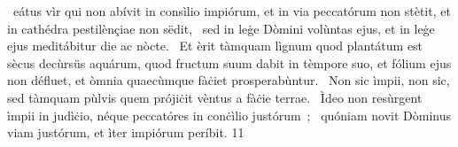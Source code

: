 {%
~eátus vìr qui non abívit in consìlio impiórum, et in via peccatórum non stètit, et in cathédra pestilènçiae non sëdit,
~sed in leġe Dòmini volùntas ejus, et in leġe ejus meditábitur die ac nòcte.
~Et èrit tàmquam lìgnum quod plantátum est sècus decùrsüs aquárum, quod fructum suum dabit in tèmpore suo, et fólium ejus non défluet, et òmnia quaecùmque fàċiet prosperabùntur.
~Non sic ìmpii, non sic, sed tàmquam pùlvis quem prójiċit vèntus a fàċie terrae.
~Ìdeo non resùrgent ìmpii in judìċio, néque peccatóres in conċìlio justórum~;
~quóniam novit Dòminus viam justórum, et ìter impiórum períbit.}
{1}{1}
